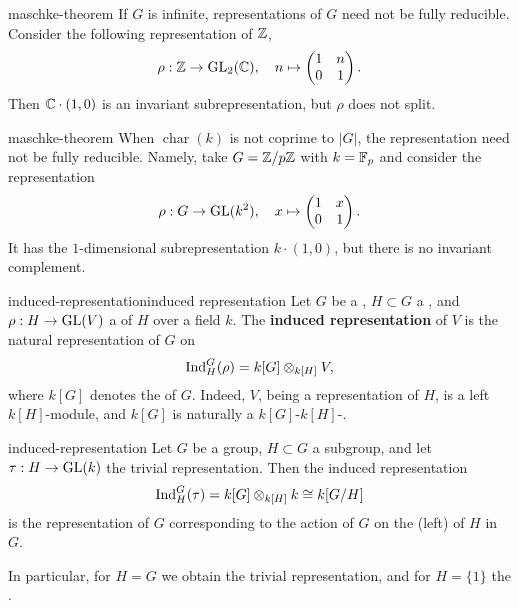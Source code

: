 \begin{example}{maschke-theorem}
    If $G$ is infinite, representations of $G$ need not be fully reducible. Consider the following representation of $\mathbb{Z}$,
    \[ \rho : \mathbb{Z} \to \textup{GL}_2(\mathbb{C}), \quad n \mapsto \begin{pmatrix} 1 & n \\ 0 & 1 \end{pmatrix} . \]
    Then $\mathbb{C} \cdot (1, 0)$ is an invariant subrepresentation, but $\rho$ does not split.
\end{example}

\begin{example}{maschke-theorem}
    When $\operatorname{char}(k)$ is not coprime to $|G|$, the representation need not be fully reducible. Namely, take $G = \mathbb{Z}/p\mathbb{Z}$ with $k = \mathbb{F}_p$ and consider the representation
    \[ \rho : G \to \textup{GL}(k^2), \quad x \mapsto \begin{pmatrix} 1 & x \\ 0 & 1 \end{pmatrix} . \]
    It has the $1$-dimensional subrepresentation $k \cdot (1, 0)$, but there is no invariant complement.
\end{example}

\begin{topic}{induced-representation}{induced representation}
    Let $G$ be a , $H \subset G$ a , and $\rho : H \to \textup{GL}(V)$ a  of $H$ over a field $k$. The \textbf{induced representation} of $V$ is the natural representation of $G$ on
    \[ \textup{Ind}_H^G (\rho) = k[G] \otimes_{k[H]} V , \]
    where $k[G]$ denotes the  of $G$. Indeed, $V$, being a representation of $H$, is a left $k[H]$-module, and $k[G]$ is naturally a $k[G]$-$k[H]$-.
\end{topic}

\begin{example}{induced-representation}
    Let $G$ be a group, $H \subset G$ a subgroup, and let $\tau : H \to \textup{GL}(k)$ the trivial representation. Then the induced representation
    \[ \textup{Ind}_H^G(\tau) = k[G] \otimes_{k[H]} k \cong k[G/H] \]
    is the representation of $G$ corresponding to the action of $G$ on the (left)  of $H$ in $G$.
    
    In particular, for $H = G$ we obtain the trivial representation, and for $H = \{ 1 \}$ the .
\end{example}

